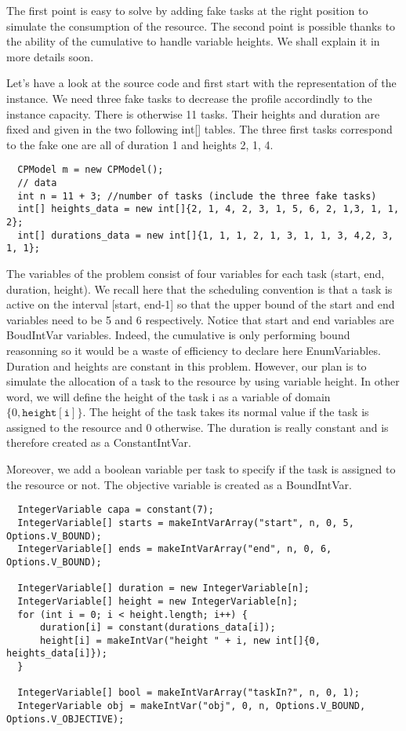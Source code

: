 The first point is easy to solve by adding fake tasks at the right position to simulate the consumption of the resource. The second point is possible thanks to the ability of the cumulative to handle variable heights. We shall explain it in more details soon.

Let's have a look at the source code and first start with the representation of the instance. We need three fake tasks to decrease the profile accordindly to the instance capacity. There is otherwise 11 tasks. Their heights and duration are fixed and given in the two following int[] tables. The three first tasks correspond to the fake one are all of duration 1 and heights 2, 1, 4. 
\begin{lstlisting}
  CPModel m = new CPModel();
  // data
  int n = 11 + 3; //number of tasks (include the three fake tasks)
  int[] heights_data = new int[]{2, 1, 4, 2, 3, 1, 5, 6, 2, 1,3, 1, 1, 2};
  int[] durations_data = new int[]{1, 1, 1, 2, 1, 3, 1, 1, 3, 4,2, 3, 1, 1};
\end{lstlisting}

The variables of the problem consist of four variables for each task (start, end, duration, height). We recall here that the scheduling convention is that a task is active on the interval [start, end-1] so that the upper bound of the start and end variables need to be 5 and 6 respectively. Notice that start and end variables are BoudIntVar variables. Indeed, the cumulative is only performing bound reasonning so it would be a waste of efficiency to declare here EnumVariables. Duration and heights are constant in this problem. However, our plan is to simulate the allocation of a task to the resource by using variable height. In other word, we will define the height of the task i as a variable of domain $\{0, \mathtt{height[i]}\}$. The height of the task takes its normal value if the task is assigned to the resource and 0 otherwise. The duration is really constant and is therefore created as a ConstantIntVar.

Moreover, we add a boolean variable per task to specify if the task is assigned to the resource or not. The objective variable is created as a BoundIntVar. 

\begin{lstlisting}
  IntegerVariable capa = constant(7);
  IntegerVariable[] starts = makeIntVarArray("start", n, 0, 5, Options.V_BOUND);
  IntegerVariable[] ends = makeIntVarArray("end", n, 0, 6, Options.V_BOUND);
  
  IntegerVariable[] duration = new IntegerVariable[n];
  IntegerVariable[] height = new IntegerVariable[n];
  for (int i = 0; i < height.length; i++) {
      duration[i] = constant(durations_data[i]);
      height[i] = makeIntVar("height " + i, new int[]{0, heights_data[i]});
  }
  
  IntegerVariable[] bool = makeIntVarArray("taskIn?", n, 0, 1);
  IntegerVariable obj = makeIntVar("obj", 0, n, Options.V_BOUND, Options.V_OBJECTIVE);
\end{lstlisting}


